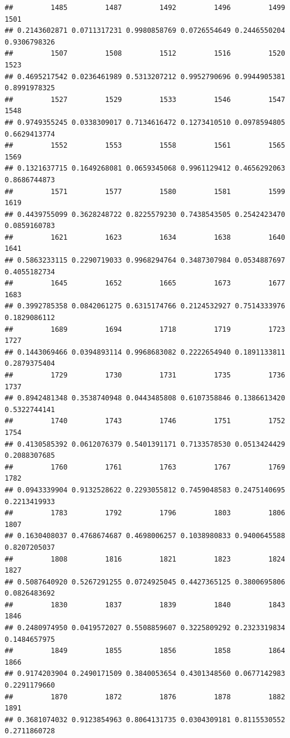 \documentclass[
]{article}
\begin{document}
\begin{verbatim}
##         1485         1487         1492         1496         1499         1501 
## 0.2143602871 0.0711317231 0.9980858769 0.0726554649 0.2446550204 0.9306798326 
##         1507         1508         1512         1516         1520         1523 
## 0.4695217542 0.0236461989 0.5313207212 0.9952790696 0.9944905381 0.8991978325 
##         1527         1529         1533         1546         1547         1548 
## 0.9749355245 0.0338309017 0.7134616472 0.1273410510 0.0978594805 0.6629413774 
##         1552         1553         1558         1561         1565         1569 
## 0.1321637715 0.1649268081 0.0659345068 0.9961129412 0.4656292063 0.8686744873 
##         1571         1577         1580         1581         1599         1619 
## 0.4439755099 0.3628248722 0.8225579230 0.7438543505 0.2542423470 0.0859160783 
##         1621         1623         1634         1638         1640         1641 
## 0.5863233115 0.2290719033 0.9968294764 0.3487307984 0.0534887697 0.4055182734 
##         1645         1652         1665         1673         1677         1683 
## 0.3992785358 0.0842061275 0.6315174766 0.2124532927 0.7514333976 0.1829086112 
##         1689         1694         1718         1719         1723         1727 
## 0.1443069466 0.0394893114 0.9968683082 0.2222654940 0.1891133811 0.2879375404 
##         1729         1730         1731         1735         1736         1737 
## 0.8942481348 0.3538740948 0.0443485808 0.6107358846 0.1386613420 0.5322744141 
##         1740         1743         1746         1751         1752         1754 
## 0.4130585392 0.0612076379 0.5401391171 0.7133578530 0.0513424429 0.2088307685 
##         1760         1761         1763         1767         1769         1782 
## 0.0943339904 0.9132528622 0.2293055812 0.7459048583 0.2475140695 0.2213419933 
##         1783         1792         1796         1803         1806         1807 
## 0.1630408037 0.4768674687 0.4698006257 0.1038980833 0.9400645588 0.8207205037 
##         1808         1816         1821         1823         1824         1827 
## 0.5087640920 0.5267291255 0.0724925045 0.4427365125 0.3800695806 0.0826483692 
##         1830         1837         1839         1840         1843         1846 
## 0.2480974950 0.0419572027 0.5508859607 0.3225809292 0.2323319834 0.1484657975 
##         1849         1855         1856         1858         1864         1866 
## 0.9174203904 0.2490171509 0.3840053654 0.4301348560 0.0677142983 0.2291179660 
##         1870         1872         1876         1878         1882         1891 
## 0.3681074032 0.9123854963 0.8064131735 0.0304309181 0.8115530552 0.2711860728 

\end{verbatim}
\end{document}
